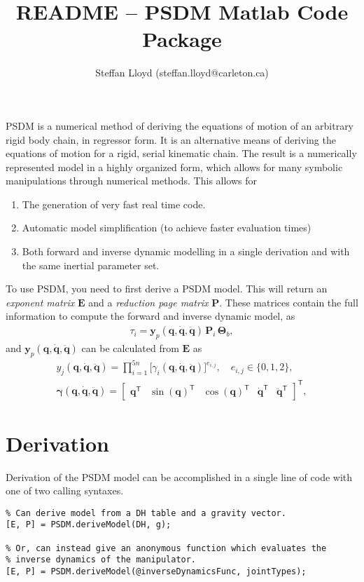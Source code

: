 \documentclass[12pt]{article}
\title{README -- PSDM Matlab Code Package}
\author{Steffan Lloyd (steffan.lloyd@carleton.ca)}
\renewcommand{\b}[1]{\mathbf{#1}}
\newcommand{\transpose}{\mathsf{T}}
\newcommand{\q}{\b{q}}
\newcommand{\qd}{\b{\dot{q}}}
\newcommand{\qdd}{\b{\ddot{q}}}
\newcommand{\bE}{\b{E}}
\newcommand{\bP}{\b{P}}
\renewcommand{\bP}{\b{P}}
\begin{document}
\maketitle

PSDM is a numerical method of deriving the equations of motion of an arbitrary rigid body chain, in regressor form. It is an alternative means of deriving the equations of motion for a rigid, serial kinematic chain. The result is a numerically represented model in a highly organized form, which allows for many symbolic manipulations through numerical methods. This allows for

\begin{enumerate}[itemsep=0pt]
 \item The generation of very fast real time code.
 \item Automatic model simplification (to achieve faster evaluation times)
 \item Both forward and inverse dynamic modelling in a single derivation and with the same inertial parameter set.
\end{enumerate}

To use PSDM, you need to first derive a PSDM model. This will return an \textit{exponent matrix} $\mathbf{E}$ and a \textit{reduction page matrix} $\mathbf{P}$. These matrices contain the full information to compute the forward and inverse dynamic model, as
\begin{align}\label{eq:ID}
	\tau_i = \mathbf{y}_p(\q, \qd, \qdd) \, \bP_i \, \mathbf{\Theta}_b,
\end{align}
and $\b{y}_p(\q, \qd, \qdd)$ can be calculated from $\bE$ as
\begin{align}
		y_j(\q, \qd, \qdd) = \prod_{i=1}^{5n} \Big[\gamma_i(\q, \qd, \qdd)\Big]^{e_{i,j}}, \quad e_{i,j} \in \big\{0, 1, 2\big\},\\
		\b{\gamma}(\q, \qd, \qdd) = \begin{bmatrix}\q^\transpose & \sin(\q)^\transpose & \cos(\q)^\transpose & \qd^\transpose & \qdd ^\transpose \end{bmatrix}^\transpose,
\end{align}

\section{Derivation}

Derivation of the PSDM model can be accomplished in a single line of code with one of two calling syntaxes. 

\begin{lstlisting}
% Can derive model from a DH table and a gravity vector.
[E, P] = PSDM.deriveModel(DH, g);

% Or, can instead give an anonymous function which evaluates the 
% inverse dynamics of the manipulator.
[E, P] = PSDM.deriveModel(@inverseDynamicsFunc, jointTypes);
\end{lstlisting}
\end{document}
